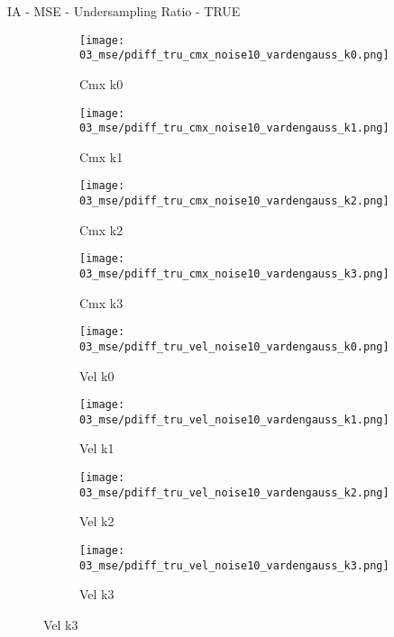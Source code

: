 \documentclass{beamer}
\begin{document}
\begin{frame}{IA - MSE - Undersampling Ratio - TRUE}{}
\begin{figure}
\begin{subfigure}{0.24\textwidth}
\texttt{[image: 03\_mse/pdiff\_tru\_cmx\_noise10\_vardengauss\_k0.png]}
\vspace{-20pt}
\caption*{\tiny Cmx k0}
\end{subfigure}
\begin{subfigure}{0.24\textwidth}
\texttt{[image: 03\_mse/pdiff\_tru\_cmx\_noise10\_vardengauss\_k1.png]}
\vspace{-20pt}
\caption*{\tiny Cmx k1}
\end{subfigure}
\begin{subfigure}{0.24\textwidth}
\texttt{[image: 03\_mse/pdiff\_tru\_cmx\_noise10\_vardengauss\_k2.png]}
\vspace{-20pt}
\caption*{\tiny Cmx k2}
\end{subfigure}
\begin{subfigure}{0.24\textwidth}
\texttt{[image: 03\_mse/pdiff\_tru\_cmx\_noise10\_vardengauss\_k3.png]}
\vspace{-20pt}
\caption*{\tiny Cmx k3}
\end{subfigure}

\begin{subfigure}{0.24\textwidth}
\texttt{[image: 03\_mse/pdiff\_tru\_vel\_noise10\_vardengauss\_k0.png]}
\vspace{-20pt}
\caption*{\tiny Vel k0}
\end{subfigure}
\begin{subfigure}{0.24\textwidth}
\texttt{[image: 03\_mse/pdiff\_tru\_vel\_noise10\_vardengauss\_k1.png]}
\vspace{-20pt}
\caption*{\tiny Vel k1}
\end{subfigure}
\begin{subfigure}{0.24\textwidth}
\texttt{[image: 03\_mse/pdiff\_tru\_vel\_noise10\_vardengauss\_k2.png]}
\vspace{-20pt}
\caption*{\tiny Vel k2}
\end{subfigure}
\begin{subfigure}{0.24\textwidth}
\texttt{[image: 03\_mse/pdiff\_tru\_vel\_noise10\_vardengauss\_k3.png]}
\vspace{-20pt}
\caption*{\tiny Vel k3}
\end{subfigure}
\end{figure}
\end{frame}
\end{document}

